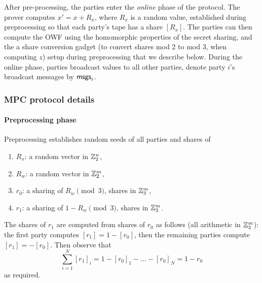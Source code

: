 After pre-processing, the parties enter the \emph{online} phase of the protocol. 
The prover computes $x'= x + R_x$, where $R_x$ is a random value, established during
preprocessing so that each party's tape has a share $[R_x]$. 
The parties can then compute the OWF using the homomorphic properties of the secret sharing, 
and the a share conversion gadget (to convert shares mod 2 to mod 3, when computing $z$)
setup during preprocessing that we describe below. 
During the online phase, parties broadcast values to all other parties, denote party $i$'s broadcast
messages by $\textsf{msgs}_i$. 

\subsubsection{MPC protocol details}

\paragraph{Preprocessing phase} Preprocessing establishes random seeds of all parties and shares of 
\begin{enumerate}
\item $R_x$: a random vector in $\mathbb{Z}_2^{n}$,
\item $R_w$: a random vector in $\mathbb{Z}_2^{m}$, 
\item $r_0$: a sharing of $R_w \pmod 3$, shares in $\mathbb{Z}_3^m$,  
\item $r_1$: a sharing of $1-R_w \pmod 3$, shares in $\mathbb{Z}_3^m$. 
\end{enumerate}
The shares of $r_1$ are computed from shares of $r_0$ as follows (all arithmetic in $\mathbb{Z}_3^m$): the first
party computes $[r_1] = 1 - [r_0]$, then the remaining parties compute
$[r_1] = -[r_0]$.  Then observe that 
\[\sum_{i=1}^N [r_1]_i = 1-[r_0]_1 - \ldots - [r_0]_N = 1-r_0 \]
 as required. 

